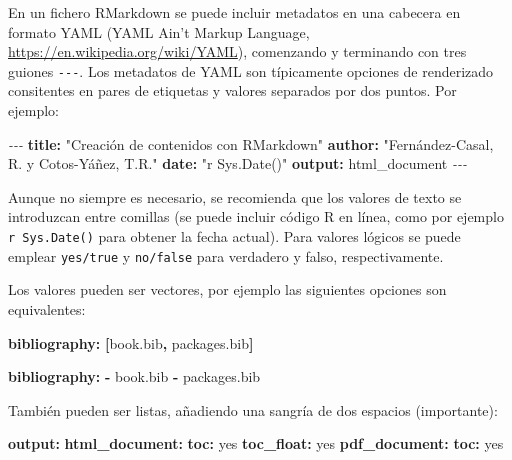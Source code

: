\documentclass[
]{book}
\newenvironment{Shaded}{\begin{snugshade}}{\end{snugshade}}
\newcommand{\AttributeTok}[1]{\textcolor[rgb]{0.13,0.29,0.53}{#1}}
\newcommand{\CharTok}[1]{\textcolor[rgb]{0.31,0.60,0.02}{#1}}
\newcommand{\FunctionTok}[1]{\textcolor[rgb]{0.13,0.29,0.53}{\textbf{#1}}}
\newcommand{\KeywordTok}[1]{\textcolor[rgb]{0.13,0.29,0.53}{\textbf{#1}}}
\newcommand{\PreprocessorTok}[1]{\textcolor[rgb]{0.56,0.35,0.01}{\textit{#1}}}
\newcommand{\StringTok}[1]{\textcolor[rgb]{0.31,0.60,0.02}{#1}}
\theoremstyle{break}
\theoremstyle{nonumberplain}
\begin{document}
En un fichero RMarkdown se puede incluir metadatos en una cabecera en formato YAML
(YAML Ain't Markup Language, \url{https://en.wikipedia.org/wiki/YAML}),
comenzando y terminando con tres guiones \texttt{-\/-\/-}.
Los metadatos de YAML son típicamente opciones de renderizado consitentes en
pares de etiquetas y valores separados por dos puntos.
Por ejemplo:

\begin{Shaded}
\begin{Highlighting}[]
\PreprocessorTok{{-}{-}{-}}
\FunctionTok{title}\KeywordTok{:}\AttributeTok{ }\StringTok{"Creación de contenidos con RMarkdown"}
\FunctionTok{author}\KeywordTok{:}\AttributeTok{ }\StringTok{"Fernández{-}Casal, R. y Cotos{-}Yáñez, T.R."}
\FunctionTok{date}\KeywordTok{:}\AttributeTok{ }\StringTok{"\textasciigrave{}r Sys.Date()\textasciigrave{}"}
\FunctionTok{output}\KeywordTok{:}\AttributeTok{ html\_document}
\PreprocessorTok{{-}{-}{-}}
\end{Highlighting}
\end{Shaded}

Aunque no siempre es necesario, se recomienda que los valores de texto se introduzcan entre comillas (se puede incluir código R en línea, como por ejemplo \texttt{\textasciigrave{}r\ Sys.Date()\textasciigrave{}} para obtener la fecha actual). Para valores lógicos se puede emplear \texttt{yes/true} y \texttt{no/false} para verdadero y falso, respectivamente.

Los valores pueden ser vectores, por ejemplo las siguientes opciones son equivalentes:

\begin{Shaded}
\begin{Highlighting}[]
\FunctionTok{bibliography}\KeywordTok{:}\AttributeTok{ }\KeywordTok{[}\AttributeTok{book.bib}\KeywordTok{,}\AttributeTok{ packages.bib}\KeywordTok{]}
\end{Highlighting}
\end{Shaded}

\begin{Shaded}
\begin{Highlighting}[]
\FunctionTok{bibliography}\KeywordTok{:}
\KeywordTok{{-}}\AttributeTok{ book.bib}
\KeywordTok{{-}}\AttributeTok{ packages.bib}
\end{Highlighting}
\end{Shaded}

También pueden ser listas, añadiendo una sangría de dos espacios (importante):

\begin{Shaded}
\begin{Highlighting}[]
\FunctionTok{output}\KeywordTok{:}
\AttributeTok{  }\FunctionTok{html\_document}\KeywordTok{:}
\AttributeTok{    }\FunctionTok{toc}\KeywordTok{:}\AttributeTok{ }\CharTok{yes}
\AttributeTok{    }\FunctionTok{toc\_float}\KeywordTok{:}\AttributeTok{ }\CharTok{yes}
\AttributeTok{  }\FunctionTok{pdf\_document}\KeywordTok{:}
\AttributeTok{    }\FunctionTok{toc}\KeywordTok{:}\AttributeTok{ }\CharTok{yes}
\end{Highlighting}
\end{Shaded}
\end{document}
